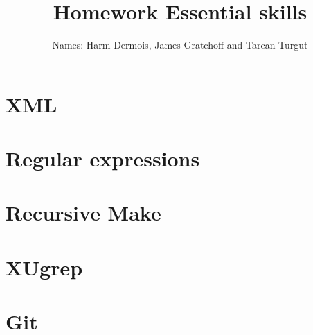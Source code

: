 \documentclass[12pt,a4paper]{article}
\begin{document}
\title{Homework Essential skills}
\author{Names: Harm Dermois, James Gratchoff and Tarcan Turgut }
\date{}
\maketitle

\section{XML}

\section{Regular expressions}

\section{Recursive Make}

\section{XUgrep}

\section{Git}

\end{document}
